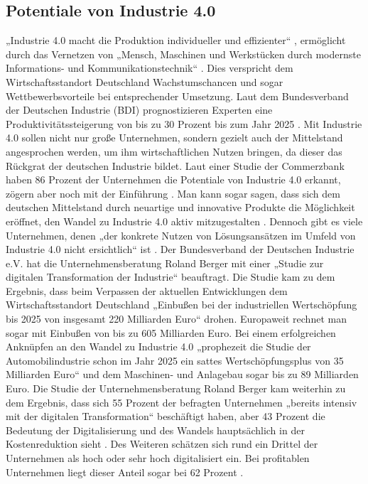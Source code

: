\subsection{Potentiale von Industrie 4.0}\label{sec:PotentialeIndustrie4.0}
„Industrie 4.0 macht die Produktion individueller und effizienter“ \cite{6}, ermöglicht durch das Vernetzen von „Mensch, Maschinen und Werkstücken durch modernste Informations- und Kommunikationstechnik“ \cite{6}. Dies verspricht dem Wirtschaftsstandort Deutschland Wachstumschancen und sogar Wettbewerbsvorteile bei entsprechender Umsetzung. Laut dem Bundesverband der Deutschen Industrie (BDI) prognostizieren Experten eine Produktivitätssteigerung von bis zu 30 Prozent bis zum Jahr 2025 \cite{6}.
\newline
Mit Industrie 4.0 sollen nicht nur große Unternehmen, sondern gezielt auch der Mittelstand angesprochen werden, um ihm wirtschaftlichen Nutzen bringen, da dieser das Rückgrat der deutschen Industrie bildet. Laut einer Studie der Commerzbank haben 86 Prozent der Unternehmen die Potentiale von Industrie 4.0 erkannt, zögern aber noch mit der Einführung \cite[S.4]{2}. Man kann sogar sagen, dass sich dem deutschen Mittelstand durch neuartige und innovative Produkte die Möglichkeit eröffnet, den Wandel zu Industrie 4.0 aktiv mitzugestalten \cite[S.8]{2}. Dennoch gibt es viele Unternehmen, denen „der konkrete Nutzen von Lösungsansätzen im Umfeld von Industrie 4.0 nicht ersichtlich“ ist \cite[S.7]{2}. 
\newline
Der Bundesverband der Deutschen Industrie e.V. hat die Unternehmensberatung Roland Berger mit einer „Studie zur digitalen Transformation der Industrie“ \cite{8} beauftragt. Die Studie kam zu dem Ergebnis, dass beim Verpassen der aktuellen Entwicklungen dem Wirtschaftsstandort Deutschland „Einbußen bei der industriellen Wertschöpfung bis 2025 von insgesamt 220 Milliarden Euro“ \cite{8} drohen. Europaweit rechnet man sogar mit Einbußen von bis zu 605 Milliarden Euro. Bei einem erfolgreichen Anknüpfen an den Wandel zu Industrie 4.0 „prophezeit die Studie der Automobilindustrie schon im Jahr 2025 ein sattes Wertschöpfungsplus von 35 Milliarden Euro“ \cite{8} und dem Maschinen- und Anlagebau sogar bis zu 89 Milliarden Euro. Die Studie der Unternehmensberatung Roland Berger kam weiterhin zu dem Ergebnis, dass sich 55 Prozent der befragten Unternehmen „bereits intensiv mit der digitalen Transformation“ \cite{8} beschäftigt haben, aber 43 Prozent die Bedeutung der Digitalisierung und des Wandels hauptsächlich in der Kostenreduktion sieht \cite{8}. Des Weiteren schätzen sich rund ein Drittel der Unternehmen als hoch oder sehr hoch digitalisiert ein. Bei profitablen Unternehmen liegt dieser Anteil sogar bei 62 Prozent \cite{8}.
